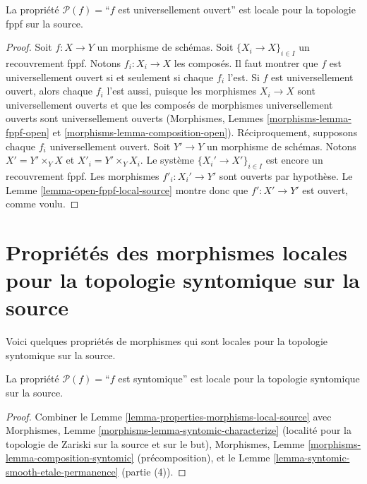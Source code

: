 \begin{lemma}
\label{lemma-universally-open-fppf-local-source}
La propriété $\mathcal{P}(f)=$``$f$ est universellement ouvert''
est locale pour la topologie fppf sur la source.
\end{lemma}

\begin{proof}
Soit $f : X \to Y$ un morphisme de schémas.
Soit $\{X_i \to X\}_{i \in I}$ un recouvrement fppf.
Notons $f_i : X_i \to X$ les composés. Il faut montrer que $f$ est
universellement ouvert si et seulement si chaque $f_i$ l'est.
Si $f$ est universellement ouvert, alors chaque $f_i$ l'est aussi, puisque les
morphismes $X_i \to X$ sont universellement ouverts et que les composés de
morphismes universellement ouverts sont universellement ouverts
(Morphismes, Lemmes \ref{morphisms-lemma-fppf-open}
et \ref{morphisms-lemma-composition-open}).
Réciproquement, supposons chaque $f_i$ universellement ouvert.
Soit $Y' \to Y$ un morphisme de schémas.
Notons $X' = Y' \times_Y X$ et $X'_i = Y' \times_Y X_i$.
Le système $\{X_i' \to X'\}_{i \in I}$ est encore un recouvrement fppf.
Les morphismes $f'_i : X_i' \to Y'$ sont ouverts par hypothèse.
Le Lemme \ref{lemma-open-fppf-local-source} montre donc que
$f' : X' \to Y'$ est ouvert, comme voulu.
\end{proof}



\section{Propriétés des morphismes locales pour la topologie syntomique sur la source}
\label{section-syntomic-local-source}

\noindent
Voici quelques propriétés de morphismes qui sont locales pour la topologie
syntomique sur la source.

\begin{lemma}
\label{lemma-syntomic-syntomic-local-source}
La propriété $\mathcal{P}(f)=$``$f$ est syntomique''
est locale pour la topologie syntomique sur la source.
\end{lemma}

\begin{proof}
Combiner le Lemme \ref{lemma-properties-morphisms-local-source} avec
Morphismes, Lemme \ref{morphisms-lemma-syntomic-characterize}
(localité pour la topologie de Zariski sur la source et sur le but),
Morphismes, Lemme \ref{morphisms-lemma-composition-syntomic}
(précomposition), et le
Lemme \ref{lemma-syntomic-smooth-etale-permanence} (partie (4)).
\end{proof}





